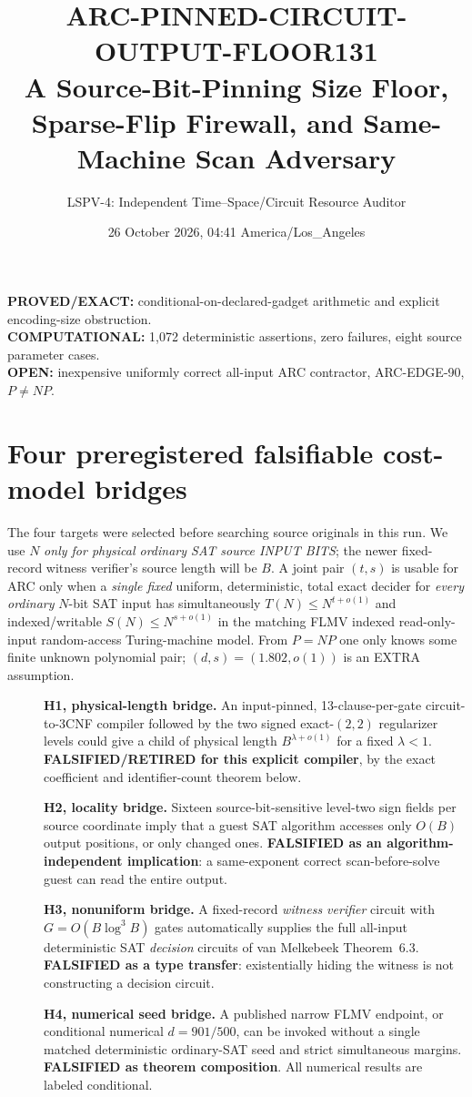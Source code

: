 \documentclass[11pt]{article}
\title{ARC-PINNED-CIRCUIT-OUTPUT-FLOOR131\\\large A Source-Bit-Pinning Size Floor, Sparse-Flip Firewall, and Same-Machine Scan Adversary}
\author{LSPV-4: Independent Time--Space/Circuit Resource Auditor}
\date{26 October 2026, 04:41 America/Los\_Angeles}
\begin{document}
\maketitle
\begin{center}
\textbf{PROVED/EXACT:} conditional-on-declared-gadget arithmetic and explicit encoding-size obstruction.\\
\textbf{COMPUTATIONAL:} 1,072 deterministic assertions, zero failures, eight source parameter cases.\\
\textbf{OPEN:} inexpensive uniformly correct all-input ARC contractor, ARC-EDGE-90, $P\ne NP$.
\end{center}

\section{Four preregistered falsifiable cost-model bridges}
The four targets were selected before searching source originals in this run. We use $N$ \emph{only for physical ordinary SAT source INPUT BITS}; the newer fixed-record witness verifier's source length will be $B$. A joint pair $(t,s)$ is usable for ARC only when a \emph{single fixed} uniform, deterministic, total exact decider for \emph{every ordinary} $N$-bit SAT input has simultaneously $T(N)\le N^{t+o(1)}$ and indexed/writable $S(N)\le N^{s+o(1)}$ in the matching FLMV indexed read-only-input random-access Turing-machine model. From $P=NP$ one only knows some finite unknown polynomial pair; $(d,s)=(1.802,o(1))$ is an EXTRA assumption.
\begin{description}
\item[] \textbf{H1, physical-length bridge.} An input-pinned, 13-clause-per-gate circuit-to-3CNF compiler followed by the two signed exact-$(2,2)$ regularizer levels could give a child of physical length $B^{\lambda+o(1)}$ for a fixed $\lambda<1$. \textbf{FALSIFIED/RETIRED for this explicit compiler}, by the exact coefficient and identifier-count theorem below.
\item[] \textbf{H2, locality bridge.} Sixteen source-bit-sensitive level-two sign fields per source coordinate imply that a guest SAT algorithm accesses only $O(B)$ output positions, or only changed ones. \textbf{FALSIFIED as an algorithm-independent implication}: a same-exponent correct scan-before-solve guest can read the entire output.
\item[] \textbf{H3, nonuniform bridge.} A fixed-record \emph{witness verifier} circuit with $G=O(B\log^3 B)$ gates automatically supplies the full all-input deterministic SAT \emph{decision} circuits of van Melkebeek Theorem~6.3. \textbf{FALSIFIED as a type transfer}: existentially hiding the witness is not constructing a decision circuit.
\item[] \textbf{H4, numerical seed bridge.} A published narrow FLMV endpoint, or conditional numerical $d=901/500$, can be invoked without a single matched deterministic ordinary-SAT seed and strict simultaneous margins. \textbf{FALSIFIED as theorem composition}. All numerical results are labeled conditional.
\end{description}
\end{document}
